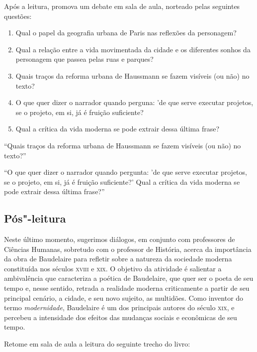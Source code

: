 \documentclass[12pt]{extarticle}
\begin{document}
Após a leitura, promova um debate em sala de aula, norteado pelas seguintes questões:

\begin{enumerate}
\item Qual o papel da geografia urbana de Paris nas reflexões da personagem?
\item Qual a relação entre a vida movimentada da cidade e os diferentes sonhos da personagem que passea pelas ruas e parques?
\item Quais traços da reforma urbana de Haussmann se fazem visíveis (ou não) no texto?
\item O que quer dizer o narrador quando perguna: 'de que serve executar projetos, se o projeto, em si, já é fruição suficiente?
\item Qual a crítica da vida moderna se pode extrair dessa última frase?
\end{enumerate}


``Quais traços da reforma urbana de Haussmann se fazem visíveis (ou não) no texto?''

``O que quer dizer o narrador quando pergunta: 'de que serve executar projetos, se o projeto, em si, já é fruição suficiente?' Qual a crítica da vida moderna se pode extrair dessa última frase?''

\subsection{Pós"-leitura}

Neste último momento, sugerimos diálogos, em conjunto com
professores de Ciências Humanas, sobretudo com o professor de História, acerca da importância da obra de Baudelaire para refletir sobre
a natureza da sociedade moderna constituída nos séculos \textsc{xviii} e \textsc{xix}. O objetivo da atividade é salientar a ambivalência que caracteriza a poética de Baudelaire, que quer ser o poeta de seu tempo e, nesse sentido, retrada a realidade moderna criticamente a partir de seu principal cenário, a cidade, e seu novo sujeito, as multidões. Como inventor do termo \textit{modernidade}, Baudelaire é um dos principais autores do século \textsc{xix}, e percebeu a intensidade dos efeitos das mudanças sociais e econômicas de seu tempo.

Retome em sala de aula a leitura do seguinte trecho do livro:
\end{document}
